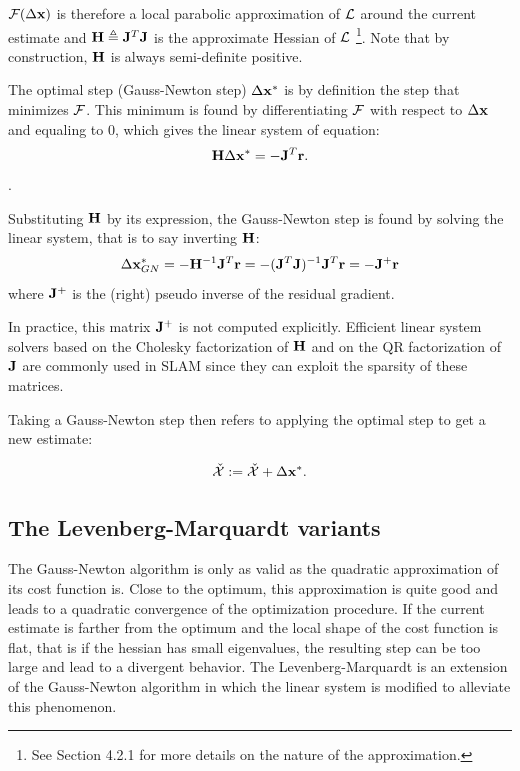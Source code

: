 $\mathcal{F}(\Delta {\bf x})$ is therefore a local parabolic approximation of 
$\mathcal{L}$ around the current estimate and ${\bf H} \triangleq {\bf J}^T {\bf J}$ is the approximate Hessian of $\mathcal{L}$ 
\footnote{See \cite{sola2017course} Section 4.2.1 for more details on the nature of the approximation.}. Note that by construction, ${\bf H}$ is always 
semi-definite positive.


The optimal step (Gauss-Newton step) $\Delta {\bf x}^*$ is by definition the step that minimizes $\mathcal{F}$. This minimum is found by differentiating $\mathcal{F}$ with respect to $\Delta {\bf x}$ and equaling to 0,
which gives the linear system of equation:
\begin{equation}
    \bfH \Delta \bfx^* = - \bfJ^T \bfr.%
    \label{eq:linear_syst_GN}
\end{equation}.

Substituting ${\bf H}$ by its expression, the Gauss-Newton step is found by solving the linear system, that is to say inverting ${\bf H}$:
%
\begin{equation*}
    \Delta {\bf x}_{GN}^* = - {\bf H}^{-1} {\bf J}^T {\bf r} = - ({\bf J}^T {\bf J})^{-1} {\bf J}^T {\bf r} = -  {\bf J}^{+} {\bf r}
\end{equation*}
%
where ${\bf J}^{+}$ is the (right) pseudo inverse of the residual gradient. 

In practice, this matrix ${\bf J}^{+}$ is not computed explicitly. Efficient linear system solvers based on the Cholesky
factorization of ${\bf H}$ and on the QR factorization of ${\bf J}$ are commonly used in SLAM since they can exploit the sparsity of these
matrices.

Taking a Gauss-Newton step then refers to applying the optimal step to get a new estimate:

\begin{equation}
    \check{\mathcal{X}} := \check{\mathcal{X}} + \Delta {\bf x}^*.
    \label{eq:gaussian_step}
\end{equation}



\subsection{The Levenberg-Marquardt variants}
The Gauss-Newton algorithm is only as valid as the quadratic approximation of its cost function is. Close to the optimum, this approximation
is quite good and leads to a quadratic convergence of the optimization procedure. If the current estimate is farther from the optimum and the
local shape of the cost function is flat, that is if the hessian has small eigenvalues, the resulting step can be too large and lead to a 
divergent behavior. The Levenberg-Marquardt is an extension of the Gauss-Newton algorithm in which the linear system  is modified
to alleviate this phenomenon.



